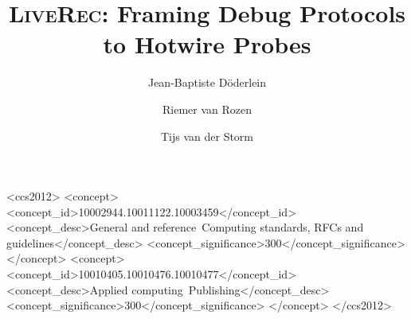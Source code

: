 \documentclass[english,submission]{programming}
\begin{document}
\title{\textsc{LiveRec}: Framing Debug Protocols to Hotwire Probes}

\author[a]{Jean-Baptiste Döderlein}
\author[b]{Riemer van Rozen}
\author[b,c]{Tijs van der Storm}




\begin{CCSXML}
<ccs2012>
<concept>
<concept_id>10002944.10011122.10003459</concept_id>
<concept_desc>General and reference~Computing standards, RFCs and guidelines</concept_desc>
<concept_significance>300</concept_significance>
</concept>
<concept>
<concept_id>10010405.10010476.10010477</concept_id>
<concept_desc>Applied computing~Publishing</concept_desc>
<concept_significance>300</concept_significance>
</concept>
</ccs2012>
\end{CCSXML}



\maketitle
\end{document}
